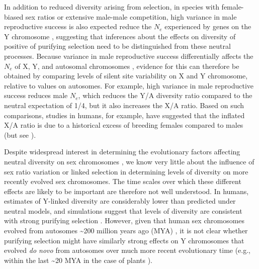 \documentclass[9pt,twocolumn,twoside]{gsajnl}
\begin{document}
In addition to reduced diversity arising from selection, in species with female-biased sex ratios or extensive male-male competition, high variance in male reproductive success is also expected reduce the $N_{e}$ experienced by genes on the Y chromosome \citep{caballero1995,charlesworth2001,laporte2002,pool2007,ellegren2009}, suggesting that inferences about the effects on diversity of positive of purifying selection need to be distinguished from these neutral processes. Because variance in male reproductive success differentially affects the $N_{e}$ of X, Y, and autosomal chromosomes \citep{kimura1964number,nomura2002effective}, evidence for this can therefore be obtained by comparing levels of silent site variability on X and Y chromosome, relative to values on autosomes. For example, high variance in male reproductive success reduces male $N_{e}$, which reduces the Y/A diversity ratio compared to the neutral expectation of 1/4, but it also increases the X/A ratio. Based on such comparisons, studies in humans, for example, have suggested that the inflated X/A ratio is due to a historical excess of breeding females compared to males \citep{hammer2008sex} (but see \citep{bustamante2009,hammer2010,cotter2016genetic}).

Despite widespread interest in determining the evolutionary factors affecting neutral diversity on sex chromosomes \citep{ellegren2011,bachtrog2013NRG}, we know very little about the influence of sex ratio variation or linked selection in determining levels of diversity on more recently evolved sex chromosomes. The time scales over which these different effects are likely to be important are therefore not well understood. In humans, estimates of Y-linked diversity are considerably lower than predicted under neutral models, and simulations suggest that levels of diversity are consistent with strong purifying selection \citep{Wilsonsayres2014}. However, given that human sex chromosomes evolved from autosomes \textasciitilde 200 million years ago (MYA) \citep{lahn1999four,ross2005dna}, it is not clear whether purifying selection might have similarly strong effects on Y chromosomes that evolved \textit{do novo} from autosomes over much more recent evolutionary time (e.g., within the last \textasciitilde 20 MYA in the case of plants \citep{charlesworth2015plant}).
\end{document}
